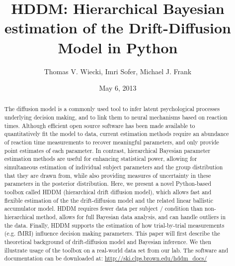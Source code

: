 \documentclass[letterpaper,10pt,english]{article}
\title{HDDM: Hierarchical Bayesian estimation of the Drift-Diffusion Model in Python}
\date{May 6, 2013}
\author{Thomas V. Wiecki, Imri Sofer, Michael J. Frank}
\begin{document}
\maketitle

\begin{abstract}
\label{abstract:abstract}
The diffusion model is a commonly used tool to infer latent psychological processes underlying decision making, and to link them to neural mechanisms based on reaction times. Although efficient open source software has been made available to quantitatively fit the model to data, current estimation methods require an abundance of reaction time measurements to recover meaningful parameters, and only provide point estimates of each parameter.  In contrast, hierarchical Bayesian parameter estimation methods are useful for enhancing statistical power, allowing for simultaneous estimation of individual subject parameters and the group distribution that they are drawn from, while also providing measures of uncertainty in these parameters in the posterior distribution. Here, we present a novel Python-based toolbox called HDDM (hierarchical drift diffusion model), which allows fast and flexible estimation of the the drift-diffusion model and the related linear ballistic accumulator model. HDDM requires fewer data per subject / condition than non-hierarchical method, allows for full Bayesian data analysis, and can handle outliers in the data.  Finally, HDDM supports the estimation of how trial-by-trial measurements (e.g. fMRI) influence decision making parameters. This paper will first describe the theoretical background of drift-diffusion model and Bayesian inference. We then illustrate usage of the toolbox on a real-world data set from our lab. The software and documentation can be downloaded at: \href{http://ski.clps.brown.edu/hddm\_docs/}{http://ski.clps.brown.edu/hddm\_docs/}
\end{abstract}

\end{document}
